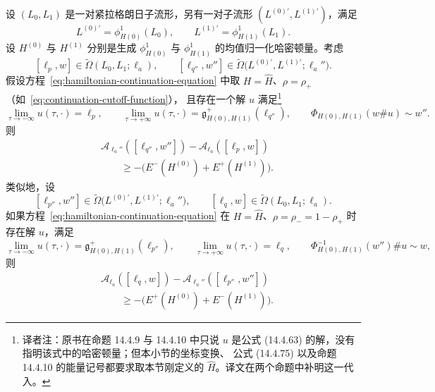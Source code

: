 \begin{proposition}
\label{prop:simultaneous-forward-reverse-level-bounds}
设 $(L_0,L_1)$ 是一对紧拉格朗日子流形，另有一对子流形
$(L^{(0)\prime},L^{(1)\prime})$，满足
\[
  L^{(0)\prime}
  =
  \phi_{H(0)}^1(L_0),
  \qquad
  L^{(1)\prime}
  =
  \phi_{H(1)}^1(L_1).
\]
设 $H^{(0)}$ 与 $H^{(1)}$ 分别是生成 $\phi_{H(0)}^1$ 与
$\phi_{H(1)}^1$ 的均值归一化哈密顿量。考虑
\[
  [\ell_p,w]\in\widetilde\Omega(L_0,L_1;\ell_a),
  \qquad
  [\ell_{q''},w'']
  \in
  \widetilde\Omega
  \bigl(L^{(0)\prime},L^{(1)\prime};\ell_a''\bigr).
\]
假设方程~\eqref{eq:hamiltonian-continuation-equation} 中取
$H=\widehat H$、$\rho=\rho_+$（如~\eqref{eq:continuation-cutoff-function}），
且存在一个解 $u$ 满足\footnote{译者注：原书在命题 14.4.9 与 14.4.10 中只说
$u$ 是公式 (14.4.63) 的解，没有指明该式中的哈密顿量；但本小节的坐标变换、
公式 (14.4.75) 以及命题 14.4.10 的能量记号都要求取本节刚定义的
$\widehat H$。译文在两个命题中补明这一代入。}
\[
  \lim_{\tau\to-\infty}u(\tau,\mathord\cdot)
  =
  \ell_p,
  \qquad
  \lim_{\tau\to+\infty}u(\tau,\mathord\cdot)
  =
  \mathfrak g_{H(0),H(1)}^+(\ell_{q''}),
  \qquad
  \Phi_{H(0),H(1)}(w\#u)\sim w''.
\]
则
\begin{equation}
  \begin{aligned}
  &\mathcal A_{\ell_a''}([\ell_{q''},w''])
  -
  \mathcal A_{\ell_a}([\ell_p,w])\\
  &\qquad\geq
  -\bigl(
    E^-(H^{(0)})+E^+(H^{(1)})
  \bigr).
  \end{aligned}
\label{eq:simultaneous-forward-level-change}
\end{equation}
类似地，设
\[
  [\ell_{p''},w'']
  \in
  \widetilde\Omega
  \bigl(L^{(0)\prime},L^{(1)\prime};\ell_a''\bigr),
  \qquad
  [\ell_q,w]\in\widetilde\Omega(L_0,L_1;\ell_a).
\]
如果方程~\eqref{eq:hamiltonian-continuation-equation} 在
$H=\widehat H$、$\rho=\rho_-=1-\rho_+$ 时存在解 $u$，满足
\[
  \lim_{\tau\to-\infty}u(\tau,\mathord\cdot)
  =
  \mathfrak g_{H(0),H(1)}^+(\ell_{p''}),
  \qquad
  \lim_{\tau\to+\infty}u(\tau,\mathord\cdot)
  =
  \ell_q,
  \qquad
  \Phi_{H(0),H(1)}^{-1}(w'')\#u\sim w,
\]
则
\begin{equation}
  \begin{aligned}
  &\mathcal A_{\ell_a}([\ell_q,w])
  -
  \mathcal A_{\ell_a''}([\ell_{p''},w''])\\
  &\qquad\geq
  -\bigl(
    E^+(H^{(0)})+E^-(H^{(1)})
  \bigr).
  \end{aligned}
\label{eq:simultaneous-reverse-level-change}
\end{equation}
\end{proposition}

